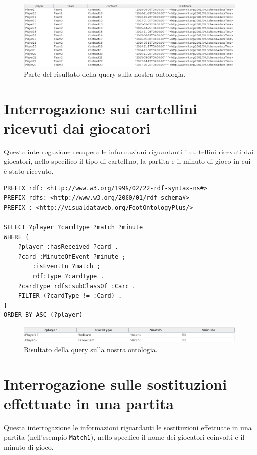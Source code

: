 \documentclass[11pt]{report} %
\begin{document}
\begin{figure}[H]
	\includegraphics[width=\textwidth]{query2}
	\caption{Parte del risultato della query sulla nostra ontologia.}
\end{figure}

\section{Interrogazione sui cartellini ricevuti dai giocatori}

Questa interrogazione recupera le informazioni riguardanti i cartellini ricevuti dai giocatori, nello specifico il tipo di cartellino, la partita e il minuto di gioco in cui è stato ricevuto. 

\begin{lstlisting}
PREFIX rdf: <http://www.w3.org/1999/02/22-rdf-syntax-ns#>
PREFIX rdfs: <http://www.w3.org/2000/01/rdf-schema#>
PREFIX : <http://visualdataweb.org/FootOntologyPlus/>

SELECT ?player ?cardType ?match ?minute
WHERE {
    ?player :hasReceived ?card .
    ?card :MinuteOfEvent ?minute ;
        :isEventIn ?match ;
        rdf:type ?cardType .
    ?cardType rdfs:subClassOf :Card .
    FILTER (?cardType != :Card) .
}
ORDER BY ASC (?player)
\end{lstlisting}

\begin{figure}[H]
	\includegraphics[width=\textwidth]{query3}
	\caption{Risultato della query sulla nostra ontologia.}
\end{figure}

\section{Interrogazione sulle sostituzioni effettuate in una partita}

Questa interrogazione le informazioni riguardanti le sostituzioni effettuate in una partita (nell'esempio \texttt{Match1}), nello specifico il nome dei giocatori coinvolti e il minuto di gioco. 
\end{document}
